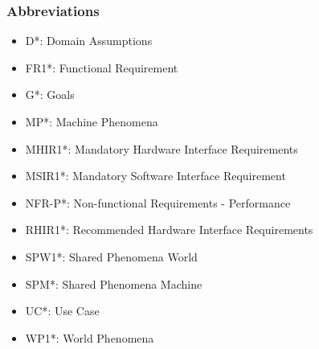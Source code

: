 \subsubsection{Abbreviations}
\begin{itemize}
    \item D*: Domain Assumptions
    \item FR1*: Functional Requirement
    \item G*: Goals
    \item MP*: Machine Phenomena
    \item MHIR1*: Mandatory Hardware Interface Requirements
    \item MSIR1*: Mandatory Software Interface Requirement
    \item NFR-P*: Non-functional Requirements - Performance
    \item RHIR1*: Recommended Hardware Interface Requirements
    \item SPW1*: Shared Phenomena World
    \item SPM*: Shared Phenomena Machine
    \item UC*: Use Case
    \item WP1*: World Phenomena
\end{itemize}
